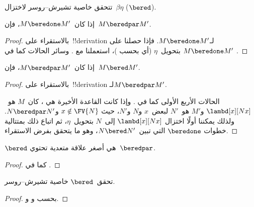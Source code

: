 \documentclass[../../../include/open-logic-section]{subfiles}
\begin{document}


تتحقق خاصية تشيرش--روسر لاختزال~$\beta\eta$ ($\bered$).

\begin{lem}
  إذا كان~$M \beredone M'$، فإن~$M \beredpar M'$.
\end{lem}

\begin{proof}
  بالاستقراء على~!!{derivation} لـ$M \beredone M'$. فإذا حصلنا على
  $M \beredone M'$ بتحويل~$\eta$ (أي بحسب
  )، استعملنا
   مع . وسائر الحالات
  كما في .
\end{proof}


\begin{lem}
  إذا كان~$M \beredpar M'$، فإن~$M \bered M'$.
\end{lem}

\begin{proof} بالاستقراء على~!!{derivation} لـ$M \beredpar M'$.

  الحالات الأربع الأولى كما في .
  وإذا كانت القاعدة الأخيرة هي ، كان~$M$
  هو~$\lambd[x][Nx]$ و$M'$ هو~$N'$ لبعض~$x$ و$N$ و$N'$، حيث
  $x \notin \FV{N}$ و$N \beredpar N'$. ولذلك يمكننا أولًا اختزال
  $\lambd[x][Nx]$ إلى~$N$ بتحويل~$\eta$، ثم اتباع ذلك بمتتالية خطوات
  $\beredone$ التي تبين~$N \bered N'$، وهو ما يتحقق بفرض الاستقراء.
\end{proof}


\begin{lem}
  $\bered$ هي أصغر علاقة متعدية تحتوي~$\beredpar$.
\end{lem}

\begin{proof}
  كما في .
\end{proof}

\begin{thm}
  تحقق~$\bered$ خاصية تشيرش--روسر.
\end{thm}

\begin{proof}
  بحسب  و و.
\end{proof}
\end{document}

